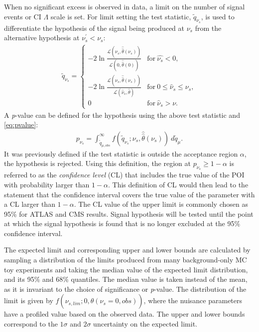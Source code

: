 When no significant excess is observed in data, a limit on the number of signal events or CI $\Lambda$ scale is set. For limit setting the test statistic, $\tilde{q}_{\nu_s}$, is used to differentiate the hypothesis of the signal being produced at $\nu_s$ from the alternative hypothesis at $\nu_s^\prime < \nu_s$:
\begin{equation}
    \label{eq:limitTestStat}
    \begin{aligned}
    \tilde{q}_{\nu_s} = \begin{cases}
        -2\ln\frac{\mathcal{L}(\nu_s,\hat{\hat{\theta}}(\nu_s))}{\mathcal{L}(0,\hat{\hat{\theta}}(0))} & \mathrm{for }~\hat{\nu_s} < 0, \\
        -2\ln\frac{\mathcal{L}(\nu_s,\hat{\hat{\theta}}(\nu_s))}{\mathcal{L}(\hat{\nu}_s,\hat{\theta})} & \mathrm{for }~0 \leq \hat{\nu}_s \leq \nu_s, \\
        0          & \mathrm{for }~\hat{\nu}_s > \nu.
    \end{cases}
    \end{aligned}
\end{equation}
A \emph{p}-value can be defined for the hypothesis using the above test statistic and \cref{eq:pvalue}:
\begin{equation}
    \label{eq:pvalue_sb}
    \begin{aligned}
        p_{\nu_s} = \int_{\tilde{q}_{\mu,obs}}^\infty f(\tilde{q}_{\nu_s};\nu_s,\hat{\hat{\theta}}(\nu_s))~d\tilde{q}_\mu.
    \end{aligned}
\end{equation}
It was previously defined if the test statistic is outside the acceptance region $\alpha$, the hypothesis is rejected. Using this definition, the region at $p_{\nu_s} \geq 1 - \alpha$ is referred to as the \emph{confidence level} (CL) that includes the true value of the POI with probability larger than $1-\alpha$. This definition of CL would then lead to the statement that the confidence interval covers the true value of the parameter with a CL larger than $1-\alpha$. The CL value of the upper limit is commonly chosen as 95\% for ATLAS and CMS results. Signal hypothesis will be tested until the point at which the signal hypothesis is found that is no longer excluded at the 95\% confidence interval. 

The expected limit and corresponding upper and lower bounds are calculated by sampling a distribution of the limits produced from many background-only MC toy experiments and taking the median value of the expected limit distribution, and its 95\% and 68\% quantiles. The median value is taken instead of the mean, as it is invariant to the choice of significance or \emph{p}-value. The distribution of the limit is given by $f(\nu_{s,lim};0,\hat{\hat{\theta}}(\nu_s = 0,obs))$, where the nuisance parameters have a profiled value based on the observed data. The upper and lower bounds correspond to the $1\sigma$ and $2\sigma$ uncertainty on the expected limit.

